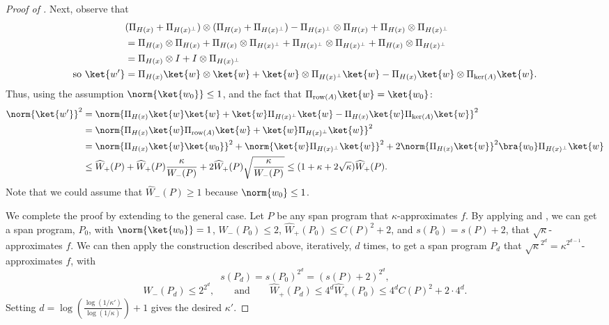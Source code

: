 \documentclass{toc}
\begin{document}
\begin{proof}[Proof of ]
Next, observe that
\begin{align*}
& (\Pi_{H(x)}+\Pi_{H(x)^\bot})\otimes(\Pi_{H(x)}+\Pi_{H(x)^\bot})-\Pi_{H(x)^\bot}\otimes\Pi_{H(x)}+\Pi_{H(x)}\otimes\Pi_{H(x)^\bot}\\
&=\Pi_{H(x)}\otimes \Pi_{H(x)}+\Pi_{H(x)}\otimes \Pi_{H(x)^\bot} + \Pi_{H(x)^\bot}\otimes \Pi_{H(x)^\bot}+\Pi_{H(x)}\otimes \Pi_{H(x)^\bot}\\
&=\Pi_{H(x)}\otimes I + I\otimes \Pi_{H(x)^\bot}\\
\mbox{so }\ket{w'} &=\Pi_{H(x)}\ket{w} \otimes \ket{w}+\ket{w}\otimes \Pi_{H(x)^\bot}\ket{w} - \Pi_{H(x)}\ket{w}\otimes \Pi_{\ker(A)}\ket{w}.
\end{align*}
Thus, using the assumption $\norm{\ket{w_0}}\leq 1$, and the fact that $\Pi_{\mathrm{row}(A)}\ket{w}=\ket{w_0}$:
\begin{align*}
\norm{\ket{w'}}^2 &= \norm{\Pi_{H(x)}\ket{w}\ket{w}+\ket{w}\Pi_{H(x)^\bot}\ket{w} - \Pi_{H(x)}\ket{w}\Pi_{\ker(A)}\ket{w}}^2\\
 &= \norm{\Pi_{H(x)}\ket{w}\Pi_{\mathrm{row}(A)}\ket{w}+\ket{w}\Pi_{H(x)^\bot}\ket{w}}^2\\
&=\norm{\Pi_{H(x)}\ket{w}\ket{w_0}}^2+\norm{\ket{w}\Pi_{H(x)^\bot}\ket{w}}^2 +2\norm{\Pi_{H(x)}\ket{w}}^2\bra{w_0}\Pi_{H(x)^\bot}\ket{w}\\
&\leq  \widehat{W}_+(P)+\widehat{W}_+(P)\frac{\kappa}{W_-(P)}+2\widehat{W}_+(P)\sqrt{\frac{\kappa}{W_-(P)}}
\leq  (1+\kappa+2\sqrt{\kappa})\widehat{W}_+(P).
\end{align*}
Note that we could assume that $\widehat{W}_-(P)\geq 1$ because $\norm{w_0}\leq 1$.


We complete the proof by extending to the general case. Let $P$ be any span program that $\kappa$-approximates $f$. By applying  and , we can get a span program, $P_0$, with $\norm{\ket{w_0}}=1$, ${W_-(P_0)}\leq 2$, $\widehat{W}_+(P_0)\leq C(P)^2+2$, and $s(P_0)=s(P)+2$, that $\sqrt{\kappa}$-approximates $f$. We can then apply the construction described above, iteratively, $d$ times, to get a span program $P_d$ that $\sqrt{\kappa}^{2^d}=\kappa^{2^{d-1}}$-approximates $f$, with
$$s(P_d)=s(P_0)^{2^d}=(s(P)+2)^{2^d},$$
$$W_-(P_d)\leq 2^{2^d},\qquad\mbox{and}\qquad 
\widehat{W}_+(P_d)\leq 4^d\widehat{W}_+(P_0)\leq 4^dC(P)^2+2\cdot 4^d.$$
Setting $d=\log\left(\frac{\log(1/\kappa')}{\log(1/\kappa)}\right)+1$ gives the desired $\kappa'$.
\end{proof}



%
\end{document}
